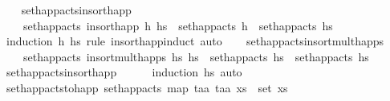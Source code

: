 \begin{isabellebody}
\endisatagproof
{\isafoldproof}%
%
\isadelimproof
\isanewline
%
\endisadelimproof
\isanewline
\ \ \isamarkupfalse%
\ set{\isacharunderscore}{\kern0pt}happ{\isacharunderscore}{\kern0pt}acts{\isacharunderscore}{\kern0pt}insort{\isacharunderscore}{\kern0pt}happ{\isacharcolon}{\kern0pt}\ \isanewline
\ \ \ \ {\isachardoublequoteopen}set{\isacharunderscore}{\kern0pt}happ{\isacharunderscore}{\kern0pt}acts\ {\isacharparenleft}{\kern0pt}insort{\isacharunderscore}{\kern0pt}happ\ h\ hs{\isacharparenright}{\kern0pt}\ {\isacharequal}{\kern0pt}\ set{\isacharunderscore}{\kern0pt}happ{\isacharunderscore}{\kern0pt}acts\ {\isacharbrackleft}{\kern0pt}h{\isacharbrackright}{\kern0pt}\ {\isasymunion}\ set{\isacharunderscore}{\kern0pt}happ{\isacharunderscore}{\kern0pt}acts\ hs{\isachardoublequoteclose}\isanewline
%
\isadelimproof
\ \ \ \ %
\endisadelimproof
%
\isatagproof
{}\isamarkupfalse%
\ {\isacharparenleft}{\kern0pt}induction\ h\ hs\ rule{\isacharcolon}{\kern0pt}\ insort{\isacharunderscore}{\kern0pt}happ{\isachardot}{\kern0pt}induct{\isacharparenright}{\kern0pt}\ auto%
\endisatagproof
{\isafoldproof}%
%
\isadelimproof
\isanewline
%
\endisadelimproof
\isanewline
\ \ \isamarkupfalse%
\ set{\isacharunderscore}{\kern0pt}happ{\isacharunderscore}{\kern0pt}acts{\isacharunderscore}{\kern0pt}insort{\isacharunderscore}{\kern0pt}mult{\isacharunderscore}{\kern0pt}happs{\isacharcolon}{\kern0pt}\ \isanewline
\ \ \ \ {\isachardoublequoteopen}set{\isacharunderscore}{\kern0pt}happ{\isacharunderscore}{\kern0pt}acts\ {\isacharparenleft}{\kern0pt}insort{\isacharunderscore}{\kern0pt}mult{\isacharunderscore}{\kern0pt}happs\ hs\ hs\ {\isacharequal}{\kern0pt}\ set{\isacharunderscore}{\kern0pt}happ{\isacharunderscore}{\kern0pt}acts\ hs\ {\isasymunion}\ set{\isacharunderscore}{\kern0pt}happ{\isacharunderscore}{\kern0pt}acts\ hs\isanewline
%
\isadelimproof
\ \ \ \ %
\endisadelimproof
%
\isatagproof
{}\isamarkupfalse%
\ set{\isacharunderscore}{\kern0pt}happ{\isacharunderscore}{\kern0pt}acts{\isacharunderscore}{\kern0pt}insort{\isacharunderscore}{\kern0pt}happ\isanewline
\ \ \ \ \isamarkupfalse%
\ {\isacharparenleft}{\kern0pt}induction\ hs\ auto%
\endisatagproof
{\isafoldproof}%
%
\isadelimproof
\isanewline
%
\endisadelimproof
\isanewline
\ \ \isamarkupfalse%
\ set{\isacharunderscore}{\kern0pt}happ{\isacharunderscore}{\kern0pt}acts{\isacharunderscore}{\kern0pt}to{\isacharunderscore}{\kern0pt}happ{\isacharcolon}{\kern0pt}\ {\isachardoublequoteopen}set{\isacharunderscore}{\kern0pt}happ{\isacharunderscore}{\kern0pt}acts\ {\isacharparenleft}{\kern0pt}map\ {\isacharparenleft}{\kern0pt}{\isasymlambda}{\isacharparenleft}{\kern0pt}t\isactrlsub a{\isacharcomma}{\kern0pt}a{\isacharparenright}{\kern0pt}{\isachardot}{\kern0pt}\ {\isacharparenleft}{\kern0pt}t\isactrlsub a{\isacharcomma}{\kern0pt}{\isacharbrackleft}{\kern0pt}a{\isacharbrackright}{\kern0pt}{\isacharparenright}{\kern0pt}{\isacharparenright}{\kern0pt}\ xs{\isacharparenright}{\kern0pt}\ {\isacharequal}{\kern0pt}\ set\ xs{\isachardoublequoteclose}\isanewline

\end{isabellebody}
